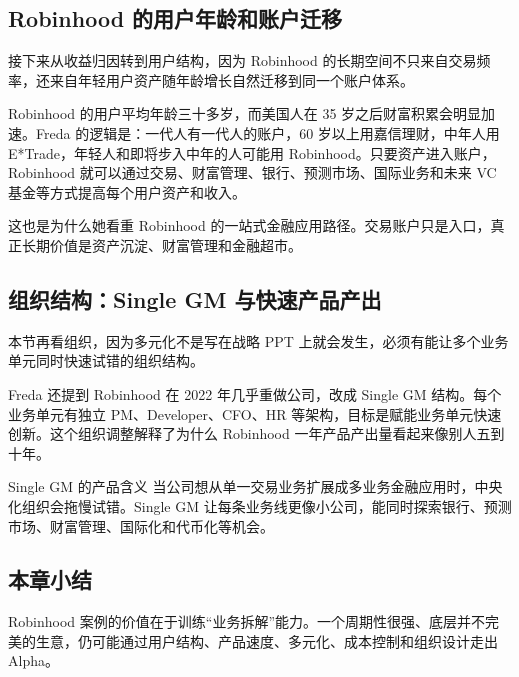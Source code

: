 \subsection{Robinhood 的用户年龄和账户迁移}

接下来从收益归因转到用户结构，因为 Robinhood 的长期空间不只来自交易频率，还来自年轻用户资产随年龄增长自然迁移到同一个账户体系。

Robinhood 的用户平均年龄三十多岁，而美国人在 35 岁之后财富积累会明显加速。Freda 的逻辑是：一代人有一代人的账户，60 岁以上用嘉信理财，中年人用 E*Trade，年轻人和即将步入中年的人可能用 Robinhood。只要资产进入账户，Robinhood 就可以通过交易、财富管理、银行、预测市场、国际业务和未来 VC 基金等方式提高每个用户资产和收入。

这也是为什么她看重 Robinhood 的一站式金融应用路径。交易账户只是入口，真正长期价值是资产沉淀、财富管理和金融超市。

\subsection{组织结构：Single GM 与快速产品产出}

本节再看组织，因为多元化不是写在战略 PPT 上就会发生，必须有能让多个业务单元同时快速试错的组织结构。

Freda 还提到 Robinhood 在 2022 年几乎重做公司，改成 Single GM 结构。每个业务单元有独立 PM、Developer、CFO、HR 等架构，目标是赋能业务单元快速创新。这个组织调整解释了为什么 Robinhood 一年产品产出量看起来像别人五到十年。

\begin{importantbox}{Single GM 的产品含义}
当公司想从单一交易业务扩展成多业务金融应用时，中央化组织会拖慢试错。Single GM 让每条业务线更像小公司，能同时探索银行、预测市场、财富管理、国际化和代币化等机会。
\end{importantbox}

\subsection{本章小结}

Robinhood 案例的价值在于训练“业务拆解”能力。一个周期性很强、底层并不完美的生意，仍可能通过用户结构、产品速度、多元化、成本控制和组织设计走出 Alpha。


